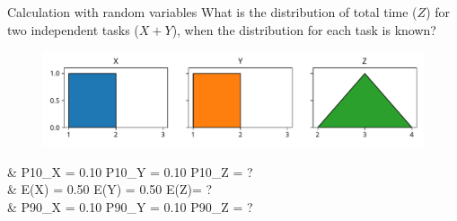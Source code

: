 \documentclass[12pt, aspectratio=149]{beamer}
\theoremstyle{plain}
\begin{document}
\begin{frame}[fragile]{Calculation with random variables}
	What is the distribution of total time ($Z$) for two independent tasks ($X + Y$), when the distribution for each task is known?
    \begin{center}
     \begin{figure}
     	\centering
     	\includegraphics[width=0.99\linewidth]{figures/add_uniform}
     \end{figure}
     \end{center}
	 \begin{flalign*}
     &\hspace*{1em} P10_X = 0.10 \hspace*{4em} P10_Y = 0.10 \hspace*{4em}  P10_Z = ? \\
	 &\hspace*{1em} E(X) = 0.50 \hspace*{4em}  E(Y) = 0.50 \hspace*{4em}  E(Z)= ? \\
     &\hspace*{1em} P90_X = 0.10 \hspace*{4em} P90_Y = 0.10 \hspace*{4em}  P90_Z = ? \\
	\end{flalign*}
\end{frame}
\end{document}
